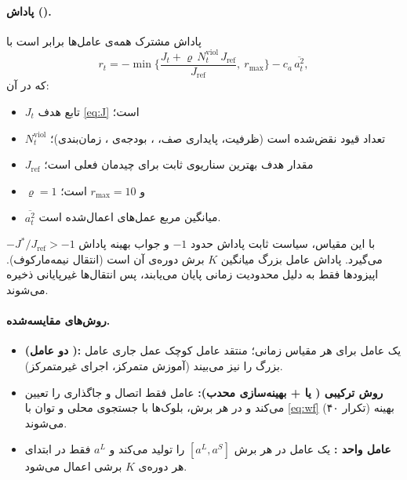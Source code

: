 \documentclass[12pt,oneside]{report}
\begin{document}
\paragraph{پاداش ().}
پاداش مشترک همه‌ی عامل‌ها برابر است با
\begin{equation}\label{eq:reward}
	r_t=-\min\Big\{\frac{J_t+\varrho\,N^{\text{viol}}_t\,J_{\text{ref}}}{J_{\text{ref}}},\ r_{\max}\Big\}-c_a\,\overline{a_t^{2}},
\end{equation}
که در آن:
\begin{itemize}
	\item $J_t$ تابع هدف \eqref{eq:J} است؛
	\item $N^{\text{viol}}_t$ تعداد قیود نقض‌شده است (ظرفیت، پایداری صف، ، بودجه‌ی ، زمان‌بندی)؛
	\item $J_{\text{ref}}$ مقدار هدف بهترین سناریوی ثابت برای چیدمان فعلی است؛
	\item $\varrho=1$ و $r_{\max}=10$ است؛
	\item $\overline{a_t^2}$ میانگین مربع عمل‌های اعمال‌شده است.
\end{itemize}
با این مقیاس، سیاست ثابت پاداش حدود $-1$ و جواب بهینه پاداش $-J^*/J_{\text{ref}}>-1$ می‌گیرد. پاداش عامل بزرگ میانگین $K$ برش دوره‌ی آن است (انتقال نیمه‌مارکوف). اپیزودها فقط به دلیل محدودیت زمانی پایان می‌یابند، پس انتقال‌ها غیرپایانی ذخیره می‌شوند.

\paragraph{روش‌های مقایسه‌شده.}
\begin{itemize}
	\item \textbf{ (دو عامل ):} یک عامل  برای هر مقیاس زمانی؛ منتقد عامل کوچک عمل جاری عامل بزرگ را نیز می‌بیند (آموزش متمرکز، اجرای غیرمتمرکز).
	\item \textbf{روش ترکیبی ( یا  + بهینه‌سازی محدب):} عامل فقط اتصال و جاگذاری را تعیین می‌کند و در هر برش، بلوک‌ها با جستجوی محلی و توان با \eqref{eq:wf} (۴۰ تکرار) بهینه می‌شوند.
	\item \textbf{عامل واحد :} یک عامل در هر برش $[a^L,a^S]$ را تولید می‌کند و $a^L$ فقط در ابتدای هر دوره‌ی $K$ برشی اعمال می‌شود.
\end{itemize}
\end{document}
